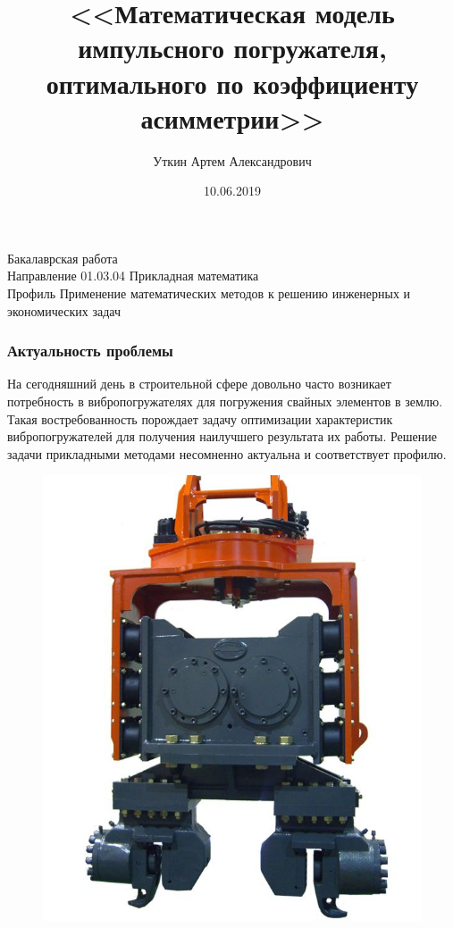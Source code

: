 \documentclass[10pt, pdf, hyperref={unicode}]{beamer}
\title{<<Математическая модель импульсного погружателя, оптимального по коэффициенту асимметрии>>}
\date{10.06.2019}
\author{Уткин Артем Александрович}
\begin{document}
    \begin{frame} %
        \titlepage
        \begin{center}
            Бакалаврская работа\\
            Направление 01.03.04 Прикладная математика\\
            Профиль Применение математических методов к решению инженерных и экономических задач
        \end{center}
    \end{frame}


    \begin{frame}
        \frametitle{Актуальность проблемы}
        \begin{center}
            \begin{minipage}[h]{0.97\linewidth}
                \begin{minipage}[h]{0.95\linewidth}
                    На сегодняшний день в строительной сфере довольно часто возникает потребность в вибропогружателях для погружения свайных элементов в землю.
                    \newline
                    Такая востребованность порождает задачу оптимизации характеристик вибропогружателей для получения наилучшего результата их работы\footnotemark[1]\footnotemark[2].
                    \newline
                    Решение задачи прикладными методами несомненно актуальна и соответствует профилю.
                \end{minipage}
                \begin{minipage}[h]{0.22\linewidth}
                    \begin{figure}[h]
                        \centering
                        \includegraphics[width=1\linewidth]{../img/photo_1.jpg}

\end{figure}
\end{minipage}
\end{minipage}
\end{center}
\end{frame}
\end{document}

